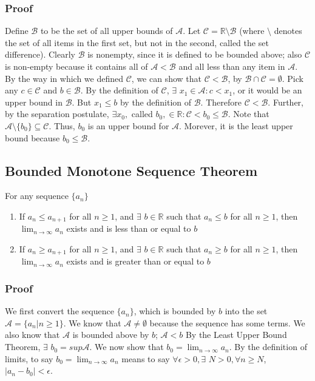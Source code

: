 \documentclass[11 pt, twoside]{article}
\begin{document}
\subsubsection{Proof}
Define $\mathcal{B}$ to be the set of all upper bounds of $\mathcal{A}$. Let
$\mathcal{C} = \mathbb{R} \setminus \mathcal{B}$ (where $\setminus$ denotes the set of all items in the first set, but not in the second, called the set difference). Clearly $\mathcal{B}$ is
nonempty, since it is defined to be bounded above; also $\mathcal{C}$ is non-empty because it contains all of $\mathcal{A} < \mathcal{B}$ and all less than any item in $\mathcal{A}$. By the way in which we defined $\mathcal{C}$, we can show that $\mathcal{C} < \mathcal{B}$, by
$\mathcal{B} \cap \mathcal{C} = \emptyset$. Pick any $c \in \mathcal{C}$ and $b
\in \mathcal{B}$. By the definition of $\mathcal{C}$, $\exists$ $x_1 \in
\mathcal{A}: c < x_1$, or it would be an upper bound in $\mathcal{B}$. But $x_1 \leq b$ by the definition of $\mathcal{B}$.
Therefore $\mathcal{C} < \mathcal{B}$. Further, by
the separation postulate, $\exists x_0,$ called $b_0, \in \mathbb{R}: \mathcal{C} <
b_0 \leq \mathcal{B}$. Note that $\mathcal{A}\setminus\{b_0\} \subseteq
\mathcal{C}$. Thus, $b_0$ is an upper bound for $\mathcal{A}$. Morever, it is
the least upper bound because $b_0 \leq \mathcal{B}$.

\subsection{Bounded Monotone Sequence Theorem}

For any sequence $\{a_n\}$
\begin{enumerate}
\item If $a_n \leq a_{n+1}$ for all $n \geq 1$, and $\exists$ $b \in
\mathbb{R}$ such that $a_n \leq b$ for all $n \geq 1$,  then
$\lim_{n\to\infty} a_n$ exists and is less than or equal to $b$
\item If $a_n \geq a_{n+1}$ for all $n \geq 1$, and $\exists$ $b \in
\mathbb{R}$ such that $a_n \geq b$ for all $n \geq 1$, then
$\lim_{n\to\infty} a_n$ exists and is greater than or equal to $b$
\end{enumerate}

\subsubsection{Proof}

We first convert the sequence $\{a_n\}$, which is bounded by $b$ into the
set $\mathcal{A} = \{a_n | n \geq 1\}$. We know that $\mathcal{A} \neq
\emptyset$ because the sequence has some terms. We also know that $\mathcal{A}$
is bounded above by $b$; $\mathcal{A} < b$
By the Least Upper Bound Theorem, $\exists$ $b_0 = sup \mathcal{A}$. We now show that $b_0 = \lim_{n\to\infty}a_n$. By the definition of limits, to say $b_0 =
\lim_{n\to\infty} a_n$ means to say $\forall \epsilon > 0, \exists$ $N > 0,
\forall n \geq N$, $|a_n - b_0| < \epsilon$.
\end{document}
